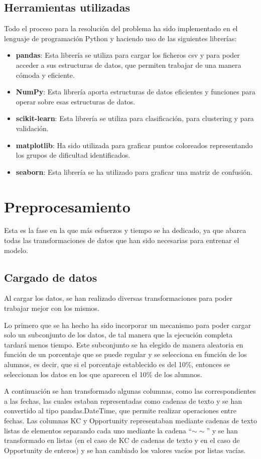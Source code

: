 \documentclass[acmtog, screen]{acmart}
\begin{document}
\subsection{Herramientas utilizadas}
Todo el proceso para la resolución del problema ha sido implementado en el lenguaje de programación Python y haciendo uso de las siguientes librerías:
\begin{itemize}
	\item \textbf{pandas}: Esta librería se utiliza para cargar los ficheros csv y para poder acceder a sus estructuras de datos, que permiten trabajar de una manera cómoda y eficiente.
	\item \textbf{NumPy}: Esta librería aporta estructuras de datos eficientes y funciones para operar sobre esas estructuras de datos.
	\item \textbf{scikit-learn}: Esta librería se utiliza para clasificación, para clustering y para validación.
	\item \textbf{matplotlib}: Ha sido utilizada para graficar puntos coloreados representando los grupos de dificultad identificados.
	\item \textbf{seaborn}: Esta librería se ha utilizado para graficar una matriz de confusión.
\end{itemize}

\section{Preprocesamiento}
Esta es la fase en la que más esfuerzos y tiempo se ha dedicado, ya que abarca todas las transformaciones de datos que han sido necesarias para entrenar el modelo.
\subsection{Cargado de datos}
Al cargar los datos, se han realizado diversas transformaciones para poder trabajar mejor con los mismos.

Lo primero que se ha hecho ha sido incorporar un mecanismo para poder cargar solo un subconjunto de los datos, de tal manera que la ejecución completa tardará menos tiempo. Este subconjunto se ha elegido de manera aleatoria en función de un porcentaje que se puede regular y se selecciona en función de los alumnos, es decir, que si el porcentaje establecido es del 10\%, entonces se seleccionan los datos en los que aparecen el 10\% de los alumnos.

A continuación se han transformado algunas columnas, como las correspondientes a las fechas, las cuales estaban representadas como cadenas de texto y se han convertido al tipo pandas.DateTime, que permite realizar operaciones entre fechas. Las columnas KC y Opportunity representaban mediante cadenas de texto listas de elementos separando cada uno mediante la cadena ``$\sim\sim$'' y se han transformado en listas (en el caso de KC de cadenas de texto y en el caso de Opportunity de enteros) y se han cambiado los valores vacíos por listas vacías.
\end{document}
